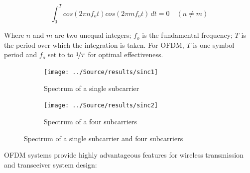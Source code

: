 \begin{equation}\label{eq:orthogonality}
    \int_{0}^{T} cos(2 \pi n f_o t) cos(2 \pi m f_o t) \,dt = 0 \quad (n \neq m)
\end{equation}

Where $n$ and $m$ are two unequal integers; $f_o$ is the fundamental frequency; $T$ is the period over which the integration is taken. For OFDM, $T$ is one symbol period and $f_o$ set to to $\nicefrac{1}{T}$ for optimal effectiveness.

\begin{figure}[htbp]
    \centering
    \begin{subfigure}[t]{.49\linewidth}
        \texttt{[image: ../Source/results/sinc1]}
        \caption{Spectrum of a single subcarrier}
        \label{fig:single}
    \end{subfigure}
    \hfil
    \begin{subfigure}[t]{0.49\linewidth}
        \texttt{[image: ../Source/results/sinc2]}
        \caption{Spectrum of a four subcarriers}
        \label{fig:four}
    \end{subfigure}
    \caption{Spectrum of a single subcarrier and four subcarriers}
    \label{fig:sinx}
\end{figure}

OFDM systems provide highly advantageous features for wireless transmission and transceiver system design:


